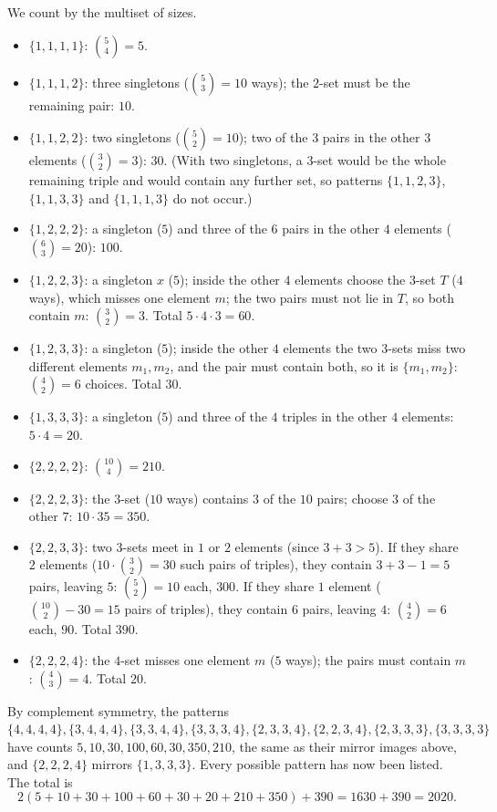 We count by the multiset of sizes.
\begin{itemize}
\item $\{1,1,1,1\}$: $\binom54=5$.
\item $\{1,1,1,2\}$: three singletons ($\binom53=10$ ways); the $2$-set must be the remaining pair: $10$.
\item $\{1,1,2,2\}$: two singletons ($\binom52=10$); two of the $3$ pairs in the other $3$ elements ($\binom32=3$): $30$. (With two singletons, a $3$-set would be the whole remaining triple and would contain any further set, so patterns $\{1,1,2,3\}$, $\{1,1,3,3\}$ and $\{1,1,1,3\}$ do not occur.)
\item $\{1,2,2,2\}$: a singleton ($5$) and three of the $6$ pairs in the other $4$ elements ($\binom63=20$): $100$.
\item $\{1,2,2,3\}$: a singleton $x$ ($5$); inside the other $4$ elements choose the $3$-set $T$ ($4$ ways), which misses one element $m$; the two pairs must not lie in $T$, so both contain $m$: $\binom32=3$. Total $5\cdot4\cdot3=60$.
\item $\{1,2,3,3\}$: a singleton ($5$); inside the other $4$ elements the two $3$-sets miss two different elements $m_1,m_2$, and the pair must contain both, so it is $\{m_1,m_2\}$: $\binom42=6$ choices. Total $30$.
\item $\{1,3,3,3\}$: a singleton ($5$) and three of the $4$ triples in the other $4$ elements: $5\cdot4=20$.
\item $\{2,2,2,2\}$: $\binom{10}4=210$.
\item $\{2,2,2,3\}$: the $3$-set ($10$ ways) contains $3$ of the $10$ pairs; choose $3$ of the other $7$: $10\cdot35=350$.
\item $\{2,2,3,3\}$: two $3$-sets meet in $1$ or $2$ elements (since $3+3>5$). If they share $2$ elements ($10\cdot\binom32=30$ such pairs of triples), they contain $3+3-1=5$ pairs, leaving $5$: $\binom52=10$ each, $300$. If they share $1$ element ($\binom{10}2-30=15$ pairs of triples), they contain $6$ pairs, leaving $4$: $\binom42=6$ each, $90$. Total $390$.
\item $\{2,2,2,4\}$: the $4$-set misses one element $m$ ($5$ ways); the pairs must contain $m$: $\binom43=4$. Total $20$.
\end{itemize}
By complement symmetry, the patterns $\{4,4,4,4\},\{3,4,4,4\},\{3,3,4,4\},\{3,3,3,4\},\{2,3,3,4\},\{2,2,3,4\},\{2,3,3,3\},\{3,3,3,3\}$ have counts $5,10,30,100,60,30,350,210$, the same as their mirror images above, and $\{2,2,2,4\}$ mirrors $\{1,3,3,3\}$. Every possible pattern has now been listed. The total is
\[
2(5+10+30+100+60+30+20+210+350)+390=1630+390=\boxed{2020}.
\]
